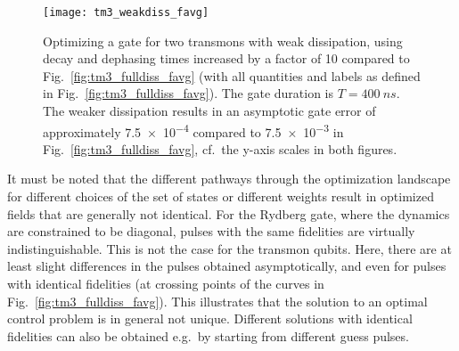 \begin{figure}[t] %
  \centering
 \texttt{[image: tm3\_weakdiss\_favg]}
 \caption{Optimizing a \sqrtISWAP{} gate for two transmons with weak
   dissipation, using
   decay and dephasing times increased by a factor of 10 compared to
   Fig.~\ref{fig:tm3_fulldiss_favg} (with all quantities and
   labels as defined in Fig.~\ref{fig:tm3_fulldiss_favg}). The gate duration
   is $T=\SI{400}{ns}$.  The weaker dissipation results in an asymptotic gate error of
   approximately \num{7.5e-4} compared to \num{7.5e-3} in
   Fig.~\ref{fig:tm3_fulldiss_favg}, cf.\ the y-axis scales in
   both figures.
   }
 \label{fig:tm3_weakdiss_favg}
\end{figure}

It must be noted that the different pathways through the
optimization landscape for different choices of the set of states or different
weights result in optimized fields that are generally not identical.
For the Rydberg gate, where the dynamics are constrained to be diagonal, pulses
with the same fidelities are virtually indistinguishable.
This is not the case for the transmon qubits. Here, there are at least slight
differences in the pulses obtained asymptotically, and even for pulses with
identical fidelities (at crossing points of the curves in
Fig.~\ref{fig:tm3_fulldiss_favg}). This illustrates that the solution to an
optimal control problem is in general not unique. Different solutions with
identical fidelities can also be obtained e.g.\ by starting from different guess
pulses.


